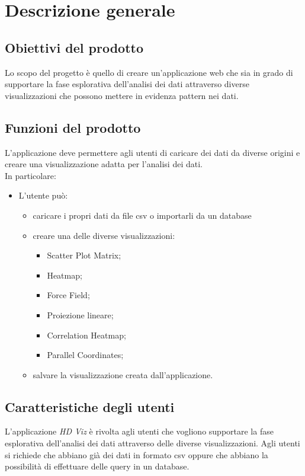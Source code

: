 \section{Descrizione generale}

\subsection{Obiettivi del prodotto}
    Lo scopo del progetto è quello di creare un'applicazione web che sia in grado di supportare la fase esplorativa dell'analisi dei dati attraverso diverse visualizzazioni che possono mettere in evidenza pattern nei dati.

\subsection{Funzioni del prodotto}
    L'applicazione deve permettere agli utenti di caricare dei dati da diverse origini e creare una visualizzazione adatta per l'analisi dei dati.
    \\
    In particolare:
    \begin{itemize}
        \item L'utente può:
        \begin{itemize}
            \item caricare i propri dati da file csv o importarli da un database
            \item creare una delle diverse visualizzazioni:
            \begin{itemize}
                \item Scatter Plot Matrix;
                \item Heatmap;
                \item Force Field;
                \item Proiezione lineare;
                \item Correlation Heatmap;
                \item Parallel Coordinates;
            \end{itemize}
            \item salvare la visualizzazione creata dall'applicazione.
        \end{itemize}
    \end{itemize}
    
\subsection{Caratteristiche degli utenti}
L'applicazione \emph{HD Viz} è rivolta agli utenti che vogliono supportare la fase esplorativa dell'analisi dei dati attraverso delle diverse visualizzazioni. Agli utenti si richiede che abbiano già dei dati in formato csv oppure che abbiano la possibilità di effettuare delle query in un database.


